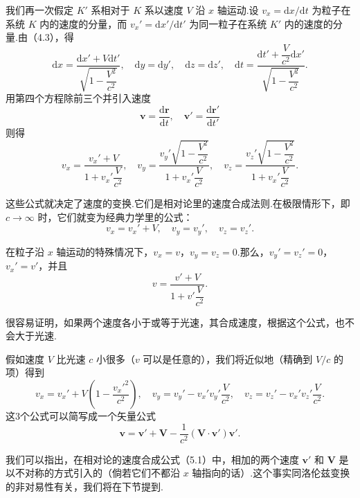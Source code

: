 我们再一次假定 $K'$ 系相对于 $K$ 系以速度 $V$ 沿 $x$ 轴运动.设 $v_x=\mathrm{d}x/\mathrm{d}t$ 为粒子在系统 $K$ 内的速度的分量，而 $v_x'=\mathrm{d}x'/\mathrm{d}t'$ 为同一粒子在系统 $K'$ 内的速度的分量.由（4.3），得
\begin{equation*}
  \mathrm{d}x=\frac{\mathrm{d}x'+V\mathrm{d}t'}{\sqrt{1-\dfrac{V^2}{c^2}}},\quad
  \mathrm{d}y=\mathrm{d}y',\quad \mathrm{d}z=\mathrm{d}z',\quad
  \mathrm{d}t=\frac{\mathrm{d}t'+\dfrac{V}{c^2}\mathrm{d}x'}{\sqrt{1-\dfrac{V^2}{c^2}}}.
\end{equation*}
用第四个方程除前三个并引入速度
\begin{equation*}
  \boldsymbol{v}=\frac{\mathrm{d}\boldsymbol{r}}{\mathrm{d}t},\quad
  \boldsymbol{v}'=\frac{\mathrm{d}\boldsymbol{r}'}{\mathrm{d}t'}
\end{equation*}
则得
\begin{equation}
  v_x=\frac{v_x'+V}{1+v_x'\dfrac{V}{c^2}},\quad
  v_y=\frac{v_y'\sqrt{1-\dfrac{V^2}{c^2}}}{1+v_x'\dfrac{V}{c^2}},\quad
  v_z=\frac{v_z'\sqrt{1-\dfrac{V^2}{c^2}}}{1+v_x'\dfrac{V}{c^2}}.
\end{equation}

这些公式就决定了速度的变换.它们是相对论里的速度合成法则.在极限情形下，即 $c\to\infty$ 时，它们就变为经典力学里的公式：
\begin{equation*}
  v_x=v_x'+V,\quad v_y=v_y',\quad v_z=v_z'.
\end{equation*}

在粒子沿 $x$ 轴运动的特殊情况下，$v_x=v$，$v_y=v_z=0$.那么，$v_y'=v_z'=0$，$v_x'=v'$，并且
\begin{equation}
  v=\frac{v'+V}{1+v'\dfrac{V}{c^2}}.
\end{equation}

很容易证明，如果两个速度各小于或等于光速，其合成速度，根据这个公式，也不会大于光速.

假如速度 $V$ 比光速 $c$ 小很多（$v$ 可以是任意的），我们将近似地（精确到 $V/c$ 的项）得到
\begin{equation*}
  v_x=v_x'+V\left(1-\frac{v_x'^2}{c^2}\right),\quad
  v_y=v_y'-v_x'v_y'\frac{V}{c^2},\quad
  v_z=v_z'-v_x'v_z'\frac{V}{c^2}.
\end{equation*}
这3个公式可以简写成一个矢量公式
\begin{equation}
  \boldsymbol{v}=\boldsymbol{v}'+\boldsymbol{V}
  -\frac{1}{c^2}(\boldsymbol{V}\cdot\boldsymbol{v}')\boldsymbol{v}'.
\end{equation}

我们可以指出，在相对论的速度合成公式（5.1）中，相加的两个速度 $\boldsymbol{v}'$ 和 $\boldsymbol{V}$ 是以不对称的方式引入的（倘若它们不都沿 $x$ 轴指向的话）.这个事实同洛伦兹变换的非对易性有关，我们将在下节提到.

